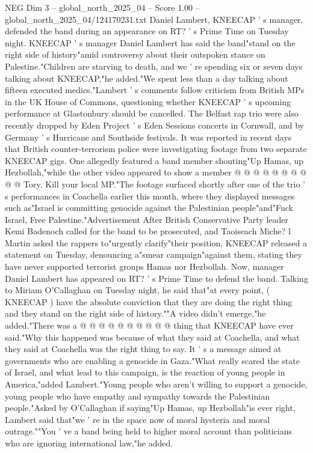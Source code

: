 \begin{textsample}{NEG Dim 3 – global\_north\_2025\_04 – Score 1.00 – global\_north\_2025\_04/124170231.txt}  \label{ex:f3_neg_412}
Daniel Lambert, KNEECAP ' s manager, defended the band during an appearance on RT? ' s Prime Time on Tuesday night.
KNEECAP ' s manager Daniel Lambert has said the band"stand on the right side of history"amid controversy about their outspoken stance on Palestine."Children are starving to death, and we ' re spending six or seven days talking about KNEECAP,"he added."We spent less than a day talking about fifteen executed medics."Lambert ' s comments follow criticism from British MPs in the UK House of Commons, questioning whether KNEECAP ' s upcoming performance at Glastonbury should be cancelled.
The Belfast rap trio were also recently dropped by Eden Project ' s Eden Sessions concerts in Cornwall, and by Germany ' s Hurricane and Southside festivals.
It was reported in recent days that British counter-terrorism police were investigating footage from two separate KNEECAP gigs.
One allegedly featured a band member shouting"Up Hamas, up Hezbollah,"while the other video appeared to show a member @ @ @ @ @ @ @ @ @ @ Tory.
Kill your local MP."The footage surfaced shortly after one of the trio ' s performances in Coachella earlier this month, where they displayed messages such as"Israel is committing genocide against the Palestinian people"and"Fuck Israel, Free Palestine."Advertisement After British Conservative Party leader Kemi Badenoch called for the band to be prosecuted, and Taoiseach Miche? l Martin asked the rappers to"urgently clarify"their position, KNEECAP released a statement on Tuesday, denouncing a"smear campaign"against them, stating they have never supported terrorist groups Hamas nor Hezbollah.
Now, manager Daniel Lambert has appeared on RT? ' s Prime Time to defend the band.
Talking to Miriam O'Callaghan on Tuesday night, he said that"at every point, ( KNEECAP ) have the absolute conviction that they are doing the right thing and they stand on the right side of history.""A video didn't emerge,"he added."There was a @ @ @ @ @ @ @ @ @ @ thing that KNEECAP have ever said."Why this happened was because of what they said at Coachella, and what they said at Coachella was the right thing to say.
It ' s a message aimed at governments who are enabling a genocide in Gaza."What really scared the state of Israel, and what lead to this campaign, is the reaction of young people in America,"added Lambert."Young people who aren't willing to support a genocide, young people who have empathy and sympathy towards the Palestinian people."Asked by O'Callaghan if saying"Up Hamas, up Hezbollah"is ever right, Lambert said that"we ' re in the space now of moral hysteria and moral outrage.""You ' ve a band being held to higher moral account than politicians who are ignoring international law,"he added.

\end{textsample}

